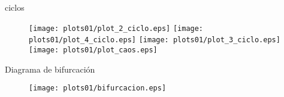 \documentclass[11pt]{beamer}
\begin{document}
\begin{frame}{ciclos}
    \begin{figure}
        \centering
\texttt{[image: plots01/plot\_2\_ciclo.eps]}
\texttt{[image: plots01/plot\_4\_ciclo.eps]}
\texttt{[image: plots01/plot\_3\_ciclo.eps]}
\texttt{[image: plots01/plot\_caos.eps]}
        \label{fig:my_label}
    \end{figure}
\end{frame}

\begin{frame}{Diagrama de bifurcación}
\vspace{-1cm}
\begin{figure}
    \centering
    \texttt{[image: plots01/bifurcacion.eps]}
    \label{fig:my_label}
\end{figure}
    
\end{frame}
	
	
\end{document}
